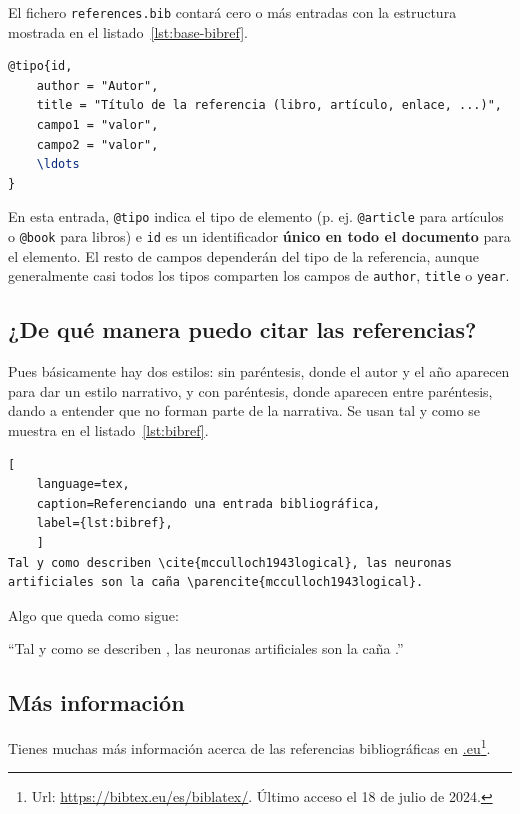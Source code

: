 \documentclass[%
    school=etsisi,%
    type=pfg,%
    degree=61CI,%
]{upm-report}
\begin{document}
El fichero \texttt{references.bib} contará cero o más entradas con la estructura mostrada en el listado~\ref{lst:base-bibref}.

\begin{lstlisting}[language=tex,caption=Estructura general de una referencia,label=lst:base-bibref]
@tipo{id,
    author = "Autor",
    title = "Título de la referencia (libro, artículo, enlace, ...)",
    campo1 = "valor",
    campo2 = "valor",
    \ldots
}
\end{lstlisting}

En esta entrada, \texttt{@tipo} indica el tipo de elemento (p. ej.
\texttt{@article} para artículos o \texttt{@book} para libros) e
\texttt{id} es un identificador \textbf{único en todo el documento} para
el elemento. El resto de campos dependerán del tipo de la referencia,
aunque generalmente casi todos los tipos comparten los campos de
\texttt{author}, \texttt{title} o \texttt{year}.

\subsection{¿De qué manera puedo citar las referencias?}

Pues básicamente hay dos estilos: sin paréntesis, donde el autor y el
año aparecen para dar un estilo narrativo, y con paréntesis, donde
aparecen entre paréntesis, dando a entender que no forman parte de la
narrativa. Se usan tal y como se muestra en el listado~\ref{lst:bibref}.

\begin{lstlisting}[
    language=tex,
    caption=Referenciando una entrada bibliográfica,
    label={lst:bibref},
    ]
Tal y como describen \cite{mcculloch1943logical}, las neuronas
artificiales son la caña \parencite{mcculloch1943logical}.
\end{lstlisting}

Algo que queda como sigue:

\enquote{Tal y como se describen \cite{mcculloch1943logical}, las
neuronas artificiales son la caña \parencite{mcculloch1943logical}.}

\subsection{Más información}

Tienes muchas más información acerca de las referencias bibliográficas
en \href{https://bibtex.eu/es/biblatex/}{.eu}\footnote{
Url: \url{https://bibtex.eu/es/biblatex/}. Último acceso el 18 de julio
de 2024.}.
\end{document}
